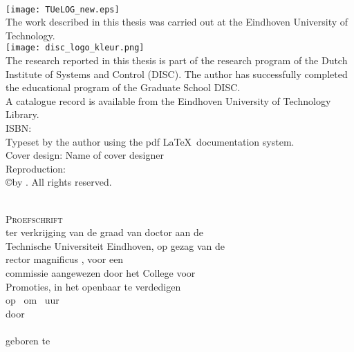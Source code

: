 \thispagestyle{empty}
\vspace*{30mm}\noindent
\begin{center}
{\LARGE\sf\maintitle}\\[4.5cm] %
{\Large\sf \@author}
\end{center}

\newpage
\thispagestyle{empty}

\vspace*{\fill}

\hspace*{-7mm}\texttt{[image: TUeLOG\_new.eps]}\\
{\small The work described in this thesis was carried out at the Eindhoven University of
Technology.}\\[8mm]

\hspace*{-4mm}\texttt{[image: disc\_logo\_kleur.png]}\\[2mm]
\noindent\bgroup\small
The research reported in this thesis is part of the research program of the Dutch Institute of Systems and Control (DISC). The author has successfully completed the educational program of the Graduate School DISC.
\\[8mm]

\noindent\bgroup\small
A catalogue record is available from the Eindhoven University of Technology Library.\\
ISBN: \isbn\\[4mm]
Typeset by the author using the pdf \LaTeX \ documentation system.\\
Cover design: Name of cover designer \\
Reproduction: \printer\\[8mm]
\copyright\year by \@author. All rights reserved.}
\egroup

\newpage
\thispagestyle{empty}



\vspace*{30mm}
\begin{center}
{\LARGE\sf\maintitle}\\[30mm] %
{\large\textsc{Proefschrift}}\\[8mm]
ter verkrijging van de graad van doctor aan de\\
Technische Universiteit Eindhoven, op gezag van de\\
rector magnificus \rector, voor een\\
commissie aangewezen door het College voor\\
Promoties, in het openbaar te verdedigen\\
op \ om \ uur\\[8mm]
door\\[8mm]
\@author\\[8mm]
geboren te \placeofbirth
\end{center}
\vfill

